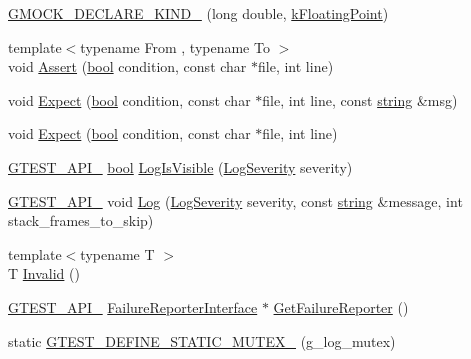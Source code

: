 \begin{DoxyCompactItemize}
\item 
\hyperlink{namespacetesting_1_1internal_af46fdd94d8aea0da729b554de443315f}{G\+M\+O\+C\+K\+\_\+\+D\+E\+C\+L\+A\+R\+E\+\_\+\+K\+I\+N\+D\+\_\+} (long double, \hyperlink{namespacetesting_1_1internal_aa8747bda20137c9aa7f846dee830e686acdce59b8c136926ace18aa9c2995878d}{k\+Floating\+Point})
\item 
{\footnotesize template$<$typename From , typename To $>$ }\\void \hyperlink{namespacetesting_1_1internal_a7a259643b7f2d23ce2b757728df42c99}{Assert} (\hyperlink{classbool}{bool} condition, const char $\ast$file, int line)
\item 
void \hyperlink{namespacetesting_1_1internal_ab3000fc56be000e4fa6ed7cdcfee3106}{Expect} (\hyperlink{classbool}{bool} condition, const char $\ast$file, int line, const \hyperlink{namespacetesting_1_1internal_a8e8ff5b11e64078831112677156cb111}{string} \&msg)
\item 
void \hyperlink{namespacetesting_1_1internal_a0dfe8a755bd02aa5ea162764b61a9d97}{Expect} (\hyperlink{classbool}{bool} condition, const char $\ast$file, int line)
\item 
\hyperlink{gtest-port_8h_aa73be6f0ba4a7456180a94904ce17790}{G\+T\+E\+S\+T\+\_\+\+A\+P\+I\+\_\+} \hyperlink{classbool}{bool} \hyperlink{namespacetesting_1_1internal_a69ffdba5ee36743e88d8f89b79e566ff}{Log\+Is\+Visible} (\hyperlink{namespacetesting_1_1internal_a203d1a8a2147a53d12bbdae40d443914}{Log\+Severity} severity)
\item 
\hyperlink{gtest-port_8h_aa73be6f0ba4a7456180a94904ce17790}{G\+T\+E\+S\+T\+\_\+\+A\+P\+I\+\_\+} void \hyperlink{namespacetesting_1_1internal_ac0bc151763a8187d74387c4b2ba685c9}{Log} (\hyperlink{namespacetesting_1_1internal_a203d1a8a2147a53d12bbdae40d443914}{Log\+Severity} severity, const \hyperlink{namespacetesting_1_1internal_a8e8ff5b11e64078831112677156cb111}{string} \&message, int stack\+\_\+frames\+\_\+to\+\_\+skip)
\item 
{\footnotesize template$<$typename T $>$ }\\T \hyperlink{namespacetesting_1_1internal_a3316c24e8a79f5def3e85d763ae50854}{Invalid} ()
\item 
\hyperlink{gtest-port_8h_aa73be6f0ba4a7456180a94904ce17790}{G\+T\+E\+S\+T\+\_\+\+A\+P\+I\+\_\+} \hyperlink{classFailureReporterInterface}{Failure\+Reporter\+Interface} $\ast$ \hyperlink{namespacetesting_1_1internal_aa261c22df383e9007129c92e36e30e62}{Get\+Failure\+Reporter} ()
\item 
static \hyperlink{namespacetesting_1_1internal_a65647f11a4a74a4282c3cc6d422af0f1}{G\+T\+E\+S\+T\+\_\+\+D\+E\+F\+I\+N\+E\+\_\+\+S\+T\+A\+T\+I\+C\+\_\+\+M\+U\+T\+E\+X\+\_\+} (g\+\_\+log\+\_\+mutex)

\end{DoxyCompactItemize}
